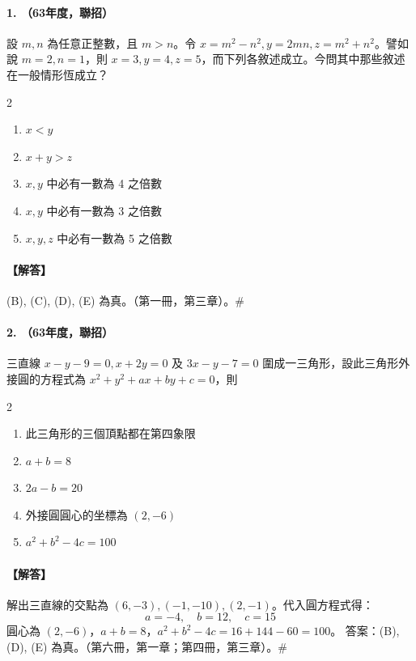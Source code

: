 \paragraph{1. （63年度，聯招）}
設 $m, n$ 為任意正整數，且 $m>n$。令 $x=m^2-n^2, y=2mn, z=m^2+n^2$。譬如說 $m=2, n=1$，則 $x=3, y=4, z=5$，而下列各敘述成立。今問其中那些敘述在一般情形恆成立？
\begin{multicols}{2}
\begin{enumerate}[label=(\Alph*)]
  \item $x < y$
  \item $x+y > z$
  \item $x, y$ 中必有一數為 4 之倍數
  \item $x, y$ 中必有一數為 3 之倍數
  \item $x, y, z$ 中必有一數為 5 之倍數
\end{enumerate}
\end{multicols}

\paragraph{【解答】}
(B), (C), (D), (E) 為真。（第一冊，第三章）。\hfill$\#$

\paragraph{2. （63年度，聯招）}
三直線 $x-y-9=0, x+2y=0$ 及 $3x-y-7=0$ 圍成一三角形，設此三角形外接圓的方程式為 $x^2+y^2+ax+by+c=0$，則
\begin{multicols}{2}
\begin{enumerate}[label=(\Alph*)]
  \item 此三角形的三個頂點都在第四象限
  \item $a+b=8$
  \item $2a-b=20$
  \item 外接圓圓心的坐標為 $(2, -6)$
  \item $a^2+b^2-4c=100$
\end{enumerate}
\end{multicols}

\paragraph{【解答】}
解出三直線的交點為 $(6,-3), (-1,-10), (2,-1)$。代入圓方程式得：
\[ a = -4, \quad b = 12, \quad c = 15 \]
圓心為 $(2, -6)$，$a+b = 8$，$a^2+b^2-4c = 16+144-60 = 100$。
答案：(B), (D), (E) 為真。（第六冊，第一章；第四冊，第三章）。\hfill$\#$


